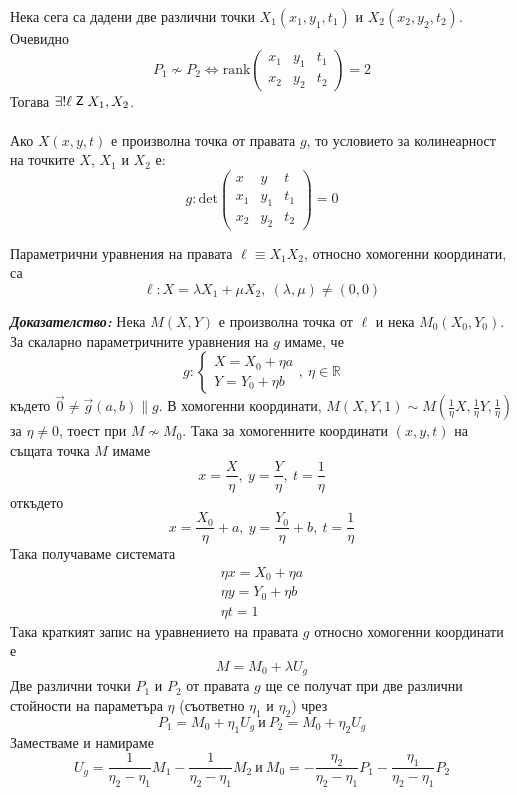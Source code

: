 \documentclass[12pt]{article}
\newcommand{\inc}{\mathrel{\raisebox{0.18ex}{\small$\mathsf{Z}$}}}
\begin{document}
{Нека сега са дадени две различни точки $X_1(x_1,y_1,t_1)$ и $X_2(x_2,y_2,t_2)$. Очевидно $$P_1\not\sim P_2\Leftrightarrow \mathrm{rank}\begin{pmatrix} x_1 & y_1 & t_1 \\ x_2 & y_2 & t_2\end{pmatrix}=2$$ Тогава $\exists!\ell\inc X_1,X_2$.\\
\\
Ако $X(x,y,t)$ е произволна точка от правата $g$, то условието за колинеарност на точките $X$, $X_1$ и $X_2$ е: $$g:\mathrm{det}\begin{pmatrix} x & y & t \\ x_1 & y_1 & t_1 \\ x_2 & y_2 & t_2\end{pmatrix}=0$$
\begin{tcolorbox}[
    colback=blue!5,    %
    colframe=blue!75!black, %
    title={\textbf{Твърдение 2:}}, %
    fonttitle=\bfseries,
    boxrule=0.8pt,
    arc=1mm,           %
    top=2mm, bottom=2mm, left=3mm, right=3mm
]  Параметрични уравнения на правата $\ell\equiv X_1X_2$, относно хомогенни координати, са $$\ell:X=\lambda X_1+\mu X_2, \ (\lambda,\mu)\neq(0,0)$$
\end{tcolorbox}
\textit{\textbf{Доказателство:}} Нека $M(X,Y)$ е произволна точка от $\ell$ и нека $M_0(X_0,Y_0)$. За скаларно параметричните уравнения на $g$ имаме, че $$g:\begin{cases}X=X_0+\eta a\\ Y=Y_0+ \eta b\end{cases},\ \eta\in\mathbb{R}$$ където $\vec{0}\neq\vec{g}(a,b)\parallel g$. В хомогенни координати, $M(X,Y,1)\sim M\left(\frac{1}{\eta}X,\frac{1}{\eta}Y,\frac{1}{\eta}\right)$ за $\eta\neq 0$, тоест при $M\not\sim M_0$. Така за хомогенните координати $(x,y,t)$ на същата точка $M$ имаме $$x=\dfrac{X}{\eta},\ y=\dfrac{Y}{\eta},\ t=\dfrac{1}{\eta}$$ откъдето $$x=\dfrac{X_0}{\eta}+a,\ y=\dfrac{Y_0}{\eta}+b,\ t=\dfrac{1}{\eta}$$ Така получаваме системата $$\begin{array}{|l}\eta x=X_0+\eta a \\ \eta y= Y_0+\eta b \\ \eta t=1\end{array}$$ Така краткият запис на уравнението на правата $g$ относно хомогенни координати е $$M=M_0+\lambda U_g$$ Две различни точки $P_1$ и $P_2$ от правата $g$ ще се получат
при две различни стойности на параметъра $\eta$ (съответно $\eta_1$ и $\eta_2$) чрез $$P_1=M_0+\eta_1U_g\ \text{и}\ P_2=M_0+\eta_2 U_g$$ Заместваме и намираме $$U_g=\dfrac{1}{\eta_2-\eta_1}M_1-\dfrac{1}{\eta_2-\eta_1}M_2\ \text{и}\ M_0=-\dfrac{\eta_2}{\eta_2-\eta_1}P_1-\dfrac{\eta_1}{\eta_2-\eta_1}P_2$$
}
\end{document}
